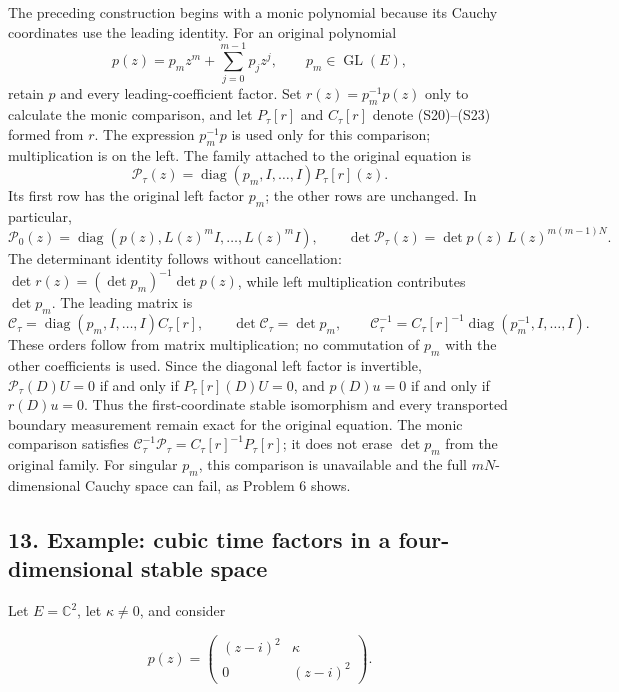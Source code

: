 \documentclass[
  11pt,
]{article}
\begin{document}
The preceding construction begins with a monic polynomial because its
Cauchy coordinates use the leading identity. For an original polynomial
\[
p(z)=p_m z^m+\sum_{j=0}^{m-1}p_jz^j,\qquad p_m\in\operatorname{GL}(E),
\] retain \(p\) and every leading-coefficient factor. Set
\(r(z)=p_m^{-1}p(z)\) only to calculate the monic comparison, and let
\(P_\tau[r]\) and \(C_\tau[r]\) denote (S20)--(S23) formed from \(r\).
The expression \(p_m^{-1}p\) is used only for this comparison;
multiplication is on the left. The family attached to the original
equation is \[
\mathcal P_\tau(z)
=\operatorname{diag}(p_m,I,\ldots,I)P_\tau[r](z).
\] Its first row has the original left factor \(p_m\); the other rows
are unchanged. In particular, \[
\mathcal P_0(z)=\operatorname{diag}(p(z),L(z)^mI,\ldots,L(z)^mI),
\qquad
\det\mathcal P_\tau(z)=\det p(z)\,L(z)^{m(m-1)N}.
\] The determinant identity follows without cancellation:
\(\det r(z)=(\det p_m)^{-1}\det p(z)\), while left multiplication
contributes \(\det p_m\). The leading matrix is \[
\mathcal C_\tau
=\operatorname{diag}(p_m,I,\ldots,I)C_\tau[r],
\qquad
\det\mathcal C_\tau=\det p_m,\qquad
\mathcal C_\tau^{-1}
=C_\tau[r]^{-1}\operatorname{diag}(p_m^{-1},I,\ldots,I).
\] These orders follow from matrix multiplication; no commutation of
\(p_m\) with the other coefficients is used. Since the diagonal left
factor is invertible, \(\mathcal P_\tau(D)U=0\) if and only if
\(P_\tau[r](D)U=0\), and \(p(D)u=0\) if and only if \(r(D)u=0\). Thus
the first-coordinate stable isomorphism and every transported boundary
measurement remain exact for the original equation. The monic comparison
satisfies
\(\mathcal C_\tau^{-1}\mathcal P_\tau=C_\tau[r]^{-1}P_\tau[r]\); it does
not erase \(\det p_m\) from the original family. For singular \(p_m\),
this comparison is unavailable and the full \(mN\)-dimensional Cauchy
space can fail, as Problem 6 shows.

\subsection{13. Example: cubic time factors in a four-dimensional stable
space}\label{example-cubic-time-factors-in-a-four-dimensional-stable-space}

Let \(E=\mathbb C^2\), let \(\kappa\ne0\), and consider

\[
p(z)=
\begin{pmatrix}(z-i)^2&\kappa\\0&(z-i)^2\end{pmatrix}.
\]
\end{document}
